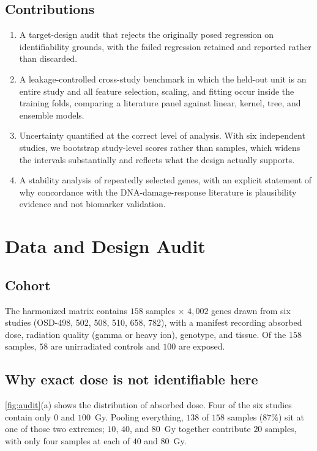 \documentclass[manuscript,nonacm]{acmart}
\begin{document}
\subsection{Contributions}
\begin{enumerate}
\item A target-design audit that rejects the originally posed regression on
      identifiability grounds, with the failed regression retained and reported rather
      than discarded.
\item A leakage-controlled cross-study benchmark in which the held-out unit is an entire
      study and all feature selection, scaling, and fitting occur inside the training
      folds, comparing a literature panel against linear, kernel, tree, and ensemble
      models.
\item Uncertainty quantified at the correct level of analysis. With six independent
      studies, we bootstrap study-level scores rather than samples, which widens the
      intervals substantially and reflects what the design actually supports.
\item A stability analysis of repeatedly selected genes, with an explicit statement of
      why concordance with the DNA-damage-response literature is plausibility evidence
      and not biomarker validation.
\end{enumerate}

\section{Data and Design Audit}

\subsection{Cohort}
The harmonized matrix contains $158$ samples $\times$ $4{,}002$ genes drawn from six
studies (OSD-498, 502, 508, 510, 658, 782), with a manifest recording absorbed dose,
radiation quality (gamma or heavy ion), genotype, and tissue. Of the $158$ samples,
$58$ are unirradiated controls and $100$ are exposed.

\subsection{Why exact dose is not identifiable here}
\cref{fig:audit}(a) shows the distribution of absorbed dose. Four of the six studies
contain only $0$ and $100$~Gy. Pooling everything, $138$ of $158$ samples ($87\%$) sit at
one of those two extremes; $10$, $40$, and $80$~Gy together contribute $20$ samples,
with only four samples at each of $40$ and $80$~Gy.
\end{document}
